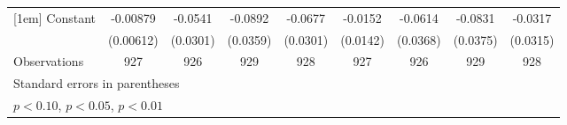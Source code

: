 {\begin{tabular}{l*{8}{c}}
[1em]
Constant            &    -0.00879         &     -0.0541\sym{*}  &     -0.0892\sym{**} &     -0.0677\sym{**} &     -0.0152         &     -0.0614\sym{*}  &     -0.0831\sym{**} &     -0.0317         \\
                    &   (0.00612)         &    (0.0301)         &    (0.0359)         &    (0.0301)         &    (0.0142)         &    (0.0368)         &    (0.0375)         &    (0.0315)         \\
\hline
Observations        &         927         &         926         &         929         &         928         &         927         &         926         &         929         &         928         \\
\hline\hline
\multicolumn{9}{l}{\footnotesize Standard errors in parentheses}\\
\multicolumn{9}{l}{\footnotesize \sym{*} \(p<0.10\), \sym{**} \(p<0.05\), \sym{***} \(p<0.01\)}\\
\end{tabular}
}
